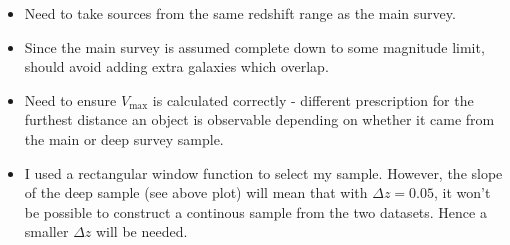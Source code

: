\documentclass[11pt]{article}
\providecommand{\tightlist}{%
      \setlength{\itemsep}{0pt}\setlength{\parskip}{0pt}}
\begin{document}
\begin{itemize}
\tightlist
\item
  Need to take sources from the same redshift range as the main survey.
\item
  Since the main survey is assumed complete down to some magnitude
  limit, should avoid adding extra galaxies which overlap.
\item
  Need to ensure \(V_{\mathrm{max}}\) is calculated correctly -
  different prescription for the furthest distance an object is
  observable depending on whether it came from the main or deep survey
  sample.
\item
  I used a rectangular window function to select my sample. However, the
  slope of the deep sample (see above plot) will mean that with
  \(\Delta z=0.05\), it won't be possible to construct a continous
  sample from the two datasets. Hence a smaller \(\Delta z\) will be
  needed.
\end{itemize}


    
    
    
    
\end{document}
